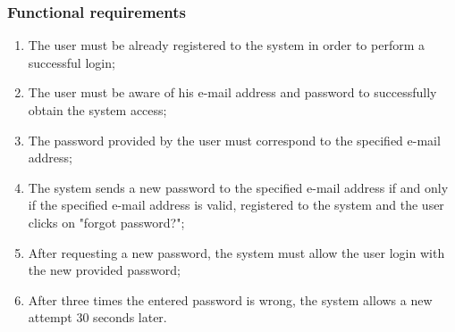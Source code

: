 \subsubsection{Functional requirements}
\begin{enumerate}
\item The user must be already registered to the system in order to perform a successful login;
\item The user must be aware of his e-mail address and password to successfully obtain the system access;
\item The password provided by the user must correspond to the specified e-mail address;
\item The system sends a new password to the specified e-mail address if and only if the specified e-mail address is valid, registered to the system and the user clicks on "forgot password?";
\item After requesting a new password, the system must allow the user login with the new provided password;
\item After three times the entered password is wrong, the system allows a new attempt 30 seconds later.
\end{enumerate}